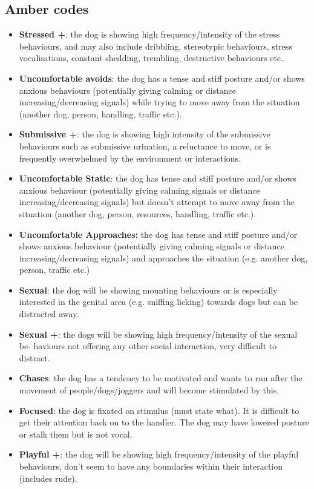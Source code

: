 \documentclass[12pt]{article}
\begin{document}
\subsection{Amber codes}
\begin{itemize}
  \item \textbf{Stressed +}: the dog is showing high frequency/intensity of the stress behaviours, and may also include dribbling, stereotypic behaviours, stress vocalisations, constant shedding, trembling, destructive behaviours etc.
  \item \textbf{Uncomfortable avoids}: the dog has a tense and stiff posture and/or shows anxious behaviours (potentially giving calming or distance increasing/decreasing signals) while trying to move away from the situation (another dog, person, handling, traffic etc.).
  \item \textbf{Submissive +}: the dog is showing high intensity of the submissive behaviours such as submissive urination, a reluctance to move, or is frequently overwhelmed by the environment or interactions.
  \item \textbf{Uncomfortable Static}: the dog has tense and stiff posture and/or shows anxious behaviour (potentially giving calming signals or distance increasing/decreasing signals) but doesn’t attempt to move away from the situation (another dog, person, resources, handling, traffic etc.).
  \item \textbf{Uncomfortable Approaches:} the dog has tense and stiff posture and/or shows anxious behaviour (potentially giving calming signals or distance increasing/decreasing signals) and approaches the situation (e.g. another dog, person, traffic etc.)
  \item \textbf{Sexual}: the dog will be showing mounting behaviours or is especially interested in the genital area (e.g. sniffing licking) towards dogs but can be distracted away.
  \item \textbf{Sexual +}: the dogs will be showing high frequency/intensity of the sexual be- haviours not offering any other social interaction, very difficult to distract.
  \item \textbf{Chases}: the dog has a tendency to be motivated and wants to run after the movement of people/dogs/joggers and will become stimulated by this.
  \item \textbf{Focused}: the dog is fixated on stimulus (must state what). It is difficult to get their attention back on to the handler. The dog may have lowered posture or stalk them but is not vocal.
  \item \textbf{Playful +}: the dog will be showing high frequency/intensity of the playful behaviours, don’t seem to have any boundaries within their interaction (includes rude).

\end{itemize}
\end{document}
